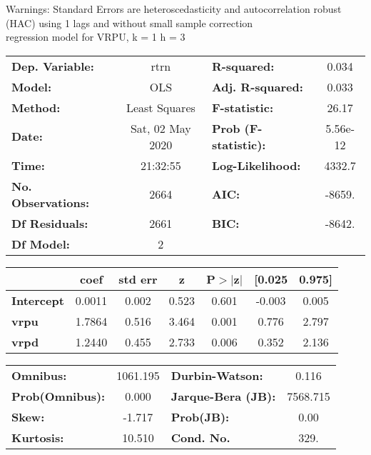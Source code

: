 Warnings: \newline
 [1] Standard Errors are heteroscedasticity and autocorrelation robust (HAC) using 1 lags and without small sample correction\\ 

regression model for VRPU, k = 1 h = 3\begin{center}
\begin{tabular}{lclc}
\toprule
\textbf{Dep. Variable:}    &       rtrn       & \textbf{  R-squared:         } &     0.034   \\
\textbf{Model:}            &       OLS        & \textbf{  Adj. R-squared:    } &     0.033   \\
\textbf{Method:}           &  Least Squares   & \textbf{  F-statistic:       } &     26.17   \\
\textbf{Date:}             & Sat, 02 May 2020 & \textbf{  Prob (F-statistic):} &  5.56e-12   \\
\textbf{Time:}             &     21:32:55     & \textbf{  Log-Likelihood:    } &    4332.7   \\
\textbf{No. Observations:} &        2664      & \textbf{  AIC:               } &    -8659.   \\
\textbf{Df Residuals:}     &        2661      & \textbf{  BIC:               } &    -8642.   \\
\textbf{Df Model:}         &           2      & \textbf{                     } &             \\
\bottomrule
\end{tabular}
\begin{tabular}{lcccccc}
                   & \textbf{coef} & \textbf{std err} & \textbf{z} & \textbf{P$> |$z$|$} & \textbf{[0.025} & \textbf{0.975]}  \\
\midrule
\textbf{Intercept} &       0.0011  &        0.002     &     0.523  &         0.601        &       -0.003    &        0.005     \\
\textbf{vrpu}      &       1.7864  &        0.516     &     3.464  &         0.001        &        0.776    &        2.797     \\
\textbf{vrpd}      &       1.2440  &        0.455     &     2.733  &         0.006        &        0.352    &        2.136     \\
\bottomrule
\end{tabular}
\begin{tabular}{lclc}
\textbf{Omnibus:}       & 1061.195 & \textbf{  Durbin-Watson:     } &    0.116  \\
\textbf{Prob(Omnibus):} &   0.000  & \textbf{  Jarque-Bera (JB):  } & 7568.715  \\
\textbf{Skew:}          &  -1.717  & \textbf{  Prob(JB):          } &     0.00  \\
\textbf{Kurtosis:}      &  10.510  & \textbf{  Cond. No.          } &     329.  \\
\bottomrule
\end{tabular}
\end{center}

